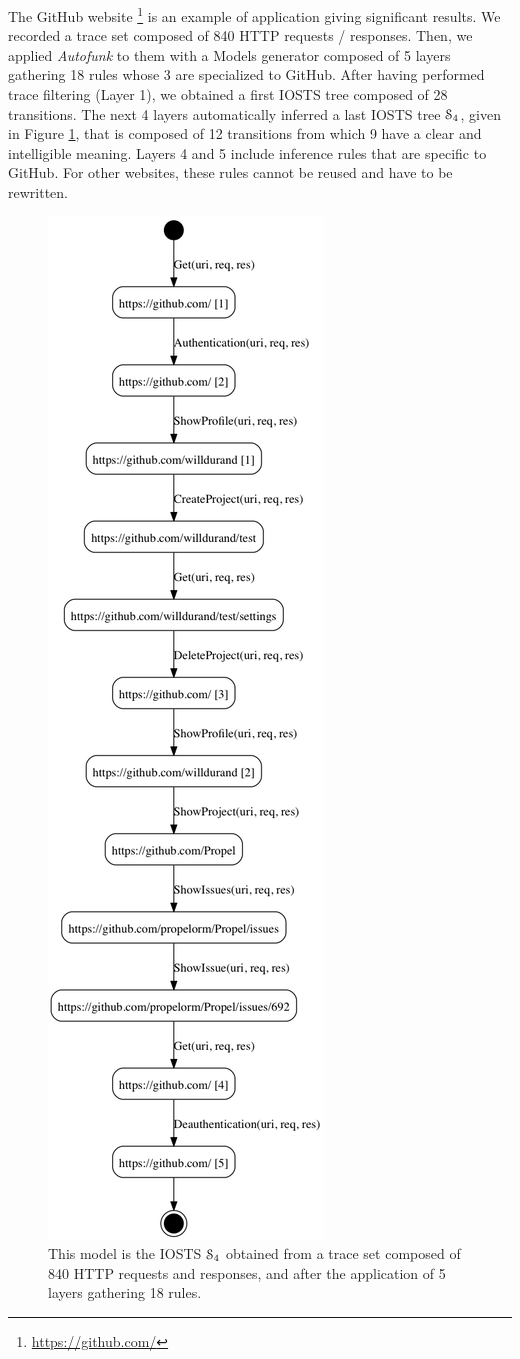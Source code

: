 The GitHub website \footnote{\url{https://github.com/}} is an
example of application giving significant results. We recorded a
trace set composed of 840 HTTP requests / responses. Then, we
applied \textit{Autofunk} to them with a Models generator
composed of 5 layers gathering 18 rules whose 3 are specialized
to GitHub. After having performed trace filtering (Layer 1), we
obtained a first IOSTS tree composed of 28 transitions. The next
4 layers automatically inferred a last IOSTS tree
$\EuScript{S}_4$, given in Figure \ref{fig:git:iosts}, that is
composed of 12 transitions from which 9 have a clear and
intelligible meaning. Layers 4 and 5 include inference rules that
are specific to GitHub. For other websites, these rules cannot be
reused and have to be rewritten.

\begin{figure}[ht]
    \begin{center}
        \includegraphics[width=.45\textwidth]{figures/gh-2-4-bis.png}
    \end{center}

    \caption {This model is the IOSTS $\EuScript{S}_4$ obtained
    from a trace set composed of 840 HTTP requests and responses,
    and after the application of 5 layers gathering 18 rules.}
    \label{fig:git:iosts}
\end{figure}


